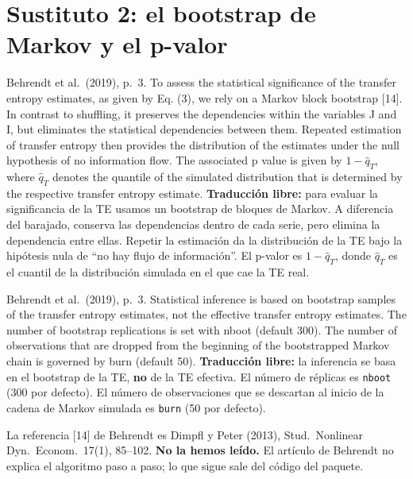 \documentclass[11pt,openany]{book}
\begin{document}
\section{Sustituto 2: el bootstrap de Markov y el p-valor}

\begin{cita}{Behrendt et al.\ (2019), p.~3.}
To assess the statistical significance of the transfer entropy estimates, as given by Eq. (3), we rely on a Markov block bootstrap [14]. In contrast to shuffling, it preserves the dependencies within the variables J and I, but eliminates the statistical dependencies between them. Repeated estimation of transfer entropy then provides the distribution of the estimates under the null hypothesis of no information flow. The associated p value is given by $1-\hat q_T$, where $\hat q_T$ denotes the quantile of the simulated distribution that is determined by the respective transfer entropy estimate.
\tcblower
\textbf{Traducción libre:} para evaluar la significancia de la TE usamos un bootstrap de bloques de Markov. A diferencia del barajado, conserva las dependencias dentro de cada serie, pero elimina la dependencia entre ellas. Repetir la estimación da la distribución de la TE bajo la hipótesis nula de ``no hay flujo de información''. El p-valor es $1-\hat q_T$, donde $\hat q_T$ es el cuantil de la distribución simulada en el que cae la TE real.
\end{cita}

\begin{cita}{Behrendt et al.\ (2019), p.~3.}
Statistical inference is based on bootstrap samples of the transfer entropy estimates, not the effective transfer entropy estimates. The number of bootstrap replications is set with nboot (default 300). The number of observations that are dropped from the beginning of the bootstrapped Markov chain is governed by burn (default 50).
\tcblower
\textbf{Traducción libre:} la inferencia se basa en el bootstrap de la TE, \textbf{no} de la TE efectiva. El número de réplicas es \texttt{nboot} (300 por defecto). El número de observaciones que se descartan al inicio de la cadena de Markov simulada es \texttt{burn} (50 por defecto).
\end{cita}

La referencia [14] de Behrendt es Dimpfl y Peter (2013), Stud.\ Nonlinear Dyn.\ Econom.\ 17(1), 85--102. \textbf{No la hemos leído.} El artículo de Behrendt no explica el algoritmo paso a paso; lo que sigue sale del código del paquete.
\end{document}
